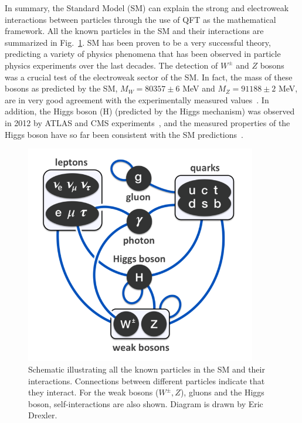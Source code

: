 In summary, the Standard Model (SM) can explain the strong and electroweak interactions between particles through the use of QFT as the mathematical framework.
All the known particles in the SM and their interactions are summarized in Fig.~\ref{fig:sm_interactions}. SM has been proven to be a very successful theory,
predicting a variety of physics phenomena that has been observed in particle physics experiments over the last decades.
The detection of $W^{\pm}$ and $Z$ bosons~\cite{UA1:WBosonDiscovery} was a crucial test of the electroweak sector of the SM. In fact,
the mass of these bosons as predicted by the SM, $M_W = 80357 \pm 6$ MeV and $M_Z = 91188 \pm 2$ MeV, 
are in very good agreement with the experimentally measured values~\cite{ATLAS:WMassMeasurement, CMS:ZMassMeasurement}. In addition,
the Higgs boson (H) (predicted by the Higgs mechanism) was observed in 2012 by ATLAS and CMS experiments~\cite{Nisati:2015iwc}, and the 
measured properties of the Higgs boson have so far been consistent with the SM predictions~\cite{CMS:2022dwd}. 

\begin{figure}[htbp]
    \centering
    \includegraphics[width=0.9\textwidth]{SM_interactions.png}
    \caption{Schematic illustrating all the known particles in the SM and their interactions. Connections between different
    particles indicate that they interact. For the weak bosons ($W^{\pm}, Z$), gluons and the Higgs boson, self-interactions
    are also shown. Diagram is drawn by Eric Drexler.}
    \label{fig:sm_interactions}
\end{figure}

\clearpage